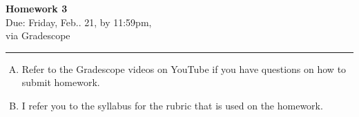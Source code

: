 \documentclass[12pt]{article}
\newif\ifshow
\begin{document}
\begin{center}
\ifshow
  \textbf{\Large Homework 0 Solution}\\
\else
  \textbf{\Large Homework 3}\\
\fi
Due: Friday, Feb.. 21, by 11:59pm,\\via Gradescope\\
\end{center}

\hrule

\vspace{0.2cm}
\noindent
\begin{enumerate}[A.]
\item Refer to the Gradescope videos on YouTube if you have questions on how to submit homework.  
\item I refer you to the syllabus for the rubric that is used on the homework.  
\end{enumerate}
\end{document}
